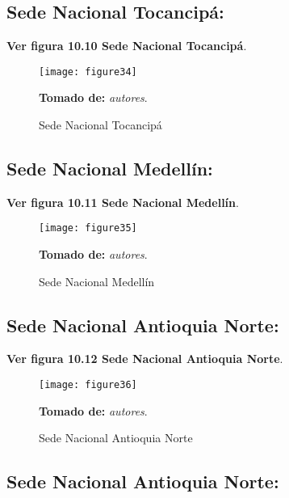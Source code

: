 \subsection{Sede Nacional Tocancipá:} %
\label{sec:Sede Nacional Tocancipá:}

\textbf{Ver figura 10.10 Sede Nacional Tocancipá}.
\begin{figure}[htbp]
  \centering
    {\texttt{[image: figure34]}}%
  \caption{Sede Nacional Tocancipá}
   \textbf{Tomado de:} \textit{autores}.
  \label{fig:fig2subfig}
\end{figure}

\subsection{Sede Nacional Medellín:} %
\label{sec:Sede Nacional Medellín:}

\textbf{Ver figura 10.11 Sede Nacional Medellín}.
\begin{figure}[htbp]
  \centering
    {\texttt{[image: figure35]}}%
  \caption{Sede Nacional Medellín}
   \textbf{Tomado de:} \textit{autores}.
  \label{fig:fig2subfig}
\end{figure}

\subsection{Sede Nacional Antioquia Norte:} %
\label{sec:Sede Nacional Antioquia Norte:}

\textbf{Ver figura 10.12 Sede Nacional Antioquia Norte}.
\begin{figure}[htbp]
  \centering
    {\texttt{[image: figure36]}}%
  \caption{Sede Nacional Antioquia Norte}
   \textbf{Tomado de:} \textit{autores}.
  \label{fig:fig2subfig}
\end{figure}

\subsection{Sede Nacional Antioquia Norte:} %
\label{sec:Sede Nacional Antioquia Norte:}


